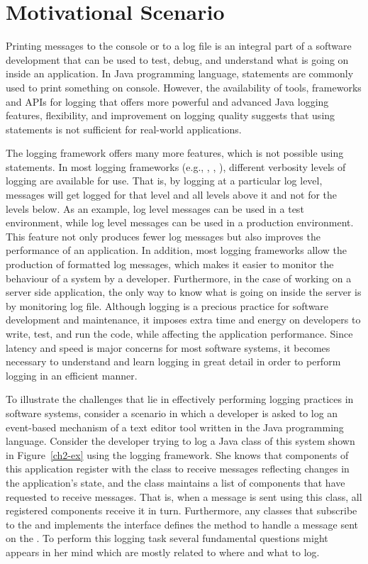 \chapter{Motivational Scenario}  \label{ch2}

Printing messages to the console or to a log file is an integral part of a software development that can be used to test, debug, and understand what is going on inside an application. In Java programming language,  statements
are commonly used to print something on console. However, the availability of tools, frameworks and APIs for logging that offers more powerful and advanced Java logging features, flexibility, and improvement on logging quality suggests that using  statements is not sufficient for real-world applications.


The logging framework offers many more features, which is not possible using  statements. In most logging frameworks (e.g., , , ), different verbosity levels of logging are available for use. That is, by logging at a particular log level, messages will get logged for that level and all levels above it and not for the levels below. As an example,  log level messages can be used in a test environment, while  log level messages can be used in a production environment. This feature not only produces fewer log messages but also improves the performance of an application. In addition, most logging frameworks allow the production of formatted log messages, which makes it easier to monitor the behaviour of a system by a developer. Furthermore, in the case of working on a server side application, the only way to know what is going on inside the server is by monitoring log file. Although logging is a precious practice for software development and maintenance, it imposes extra time and energy on developers to write, test, and run the code, while affecting the application performance. Since latency and speed is major concerns for most software systems, it becomes necessary to understand and learn logging in great detail in order to perform logging in an efficient manner.

To illustrate the challenges that lie in effectively performing logging practices in software systems, consider a scenario in which a developer is asked to log an event-based mechanism of a text editor tool written in the Java programming language. Consider the developer trying to log a Java class of this system shown in Figure~\ref{ch2-ex} using the  logging framework. She knows that components of this application register with the  class to receive messages reflecting changes in the application's state, and the  class maintains a list of components that have requested to receive messages. That is, when a message is sent using this class, all registered components receive it in turn. Furthermore, any classes that subscribe to the  and implements the  interface defines the method  to handle a message sent on the . To perform this logging task several fundamental questions might appears in her mind which are mostly related to where and what to log.

